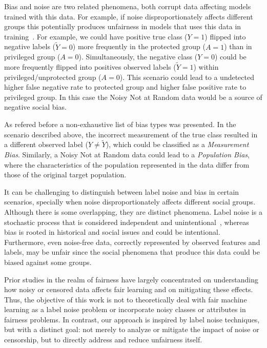 Bias and noise are two related phenomena, both corrupt data affecting models trained with this data. For example, if noise disproportionately affects different groups this potentially produces unfairness in models that uses this data in training~\citep{Wang2021}. For example, we could have positive true class ($Y = 1$) flipped into negative labels ($\tilde{Y} =0$) more frequently in the protected group ($A = 1$) than in privileged group ($A = 0$). Simultaneously, the negative class ($Y = 0$) could be more frequently flipped into positives observed labels ($\tilde{Y} = 1$) within privileged/unprotected group ($A = 0$). This scenario could lead to a undetected higher false negative rate to protected group and higher false positive rate to privileged group. In this case the Noisy Not at Random data would be a source of negative social bias.

As refered before \cite{Mehrabi2019} a non-exhaustive list of bias types was presented. In the scenario described above, the incorrect measurement of the true class resulted in a different observed label ($Y \neq \tilde{Y}$), which could be classified as a \textit{Measurement Bias}. Similarly, a Noisy Not at Random data could lead to a \textit{Population Bias}, where the characteristics of the population represented in the data differ from those of the original target population.

It can be challenging to distinguish between label noise and bias in certain scenarios, specially when noise disproportionately affects different social groups. Although there is some overlapping, they are distinct phenomena. Label noise is a stochastic process that is considered independent and unintentional~\citep{Frenay2014}, whereas bias is rooted in historical and social issues and could be intentional. Furthermore, even noise-free data, correctly represented by observed features and labels, may be unfair since the social phenomena that produce this data could be biased against some groups. 

Prior studies in the realm of fairness have largely concentrated on understanding how noisy or censored data affects fair learning and on mitigating these effects. Thus, the objective of this work is not to theoretically deal with fair machine learning as a label noise problem or incorporate noisy classes or attributes in fairness problems. In contrast, our approach is inspired by label noise techniques, but with a distinct goal: not merely to analyze or mitigate the impact of noise or censorship, but to directly address and reduce unfairness itself.